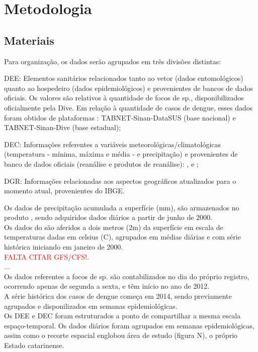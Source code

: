 \chapter{Metodologia}

\section{Materiais}

Para organização, os dados serão agrupados em três divisões distintas: 

\begin{alineas}
    \item \acrfull{DEE}: Elementos sanitários relacionados tanto ao vetor (dados entomológicos) quanto ao hospedeiro (dados epidemiológicos) e provenientes de bancos de dados oficiais. Os valores são relativos à quantidade de focos de  sp., disponibilizados oficialmente pela \acrshort{Dive}. Em relação à quantidade de casos de dengue, esses dados foram obtidos de plataformas : TABNET-\acrshort{Sinan}-\acrshort{DataSUS} (base nacional) e TABNET-\acrshort{Sinan}-\acrshort{Dive} (base estadual); 
    
    \item \acrfull{DEC}: Informações referentes a variáveis meteorológicas/climatológicas (temperatura - mínima, máxima e média - e precipitação) e provenientes de banco de dados oficiais (reanálise e produtos de reanálise):  ,  e ;

    \item \acrfull{DGR}: Informações relacionadas aos aspectos geográficos atualizados para o momento atual, provenientes do \acrshort{IBGE}. 
\end{alineas}

\indent Os dados de precipitação acumulada a superfície (mm), são armazenados no produto ,  sendo adquiridos dados diários a partir de junho de 2000.\\
\indent Os dados do  são aferidos a dois metros (2m) da superfície em escala de temperaturas dadas em celsius (C), agrupados em médias diárias e com série histórica iniciando em janeiro de 2000.\\
\indent \textcolor{red}{FALTA CITAR GFS/CFS!}.\\
\indent ...\\
\indent Os dados referentes a focos de  sp. são contabilizados no dia do próprio registro, ocorrendo apenas de segunda a sexta, e têm início no ano de 2012.\\
\indent A série histórica dos casos de dengue começa em 2014, sendo previamente agrupados e disponilizados em semanas epidemiológicas.\\
\indent Os \acrshort{DEE} e \acrshort{DEC} foram estruturados a ponto de compartilhar a mesma escala espaço-temporal. Os dados diários foram agrupados em semanas epidemiológicas, assim como o recorte espacial englobou área de estudo (figura N), o próprio Estado catarinense.


